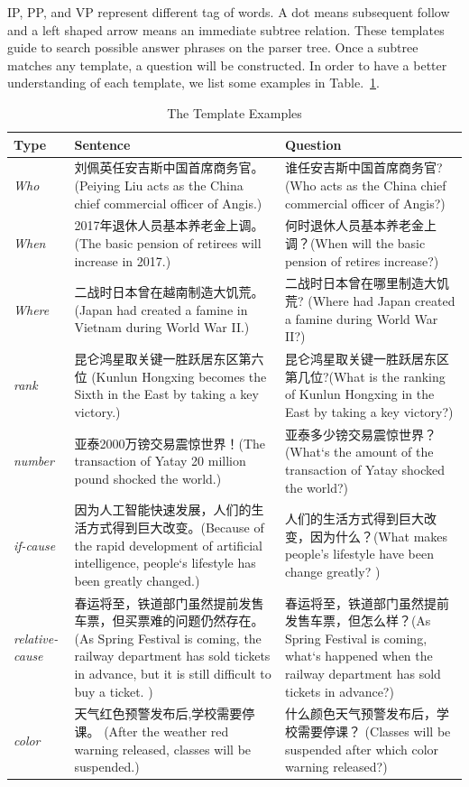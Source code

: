 \documentclass[runningheads,UTF8,article]{comsis2}
\newcommand\revised[1]{{\color{black} #1}}
\begin{document}
	IP, PP, and VP represent different tag of words. A dot means subsequent follow and a left shaped arrow means an immediate subtree relation. These templates guide to search possible answer phrases on the parser tree. Once a subtree matches any template, a question will be constructed.
	\revised{
	In order to have a better understanding of each template, we list some examples in Table.~\ref{example}.}
	
	
	\begin{table}[!ht]
		\centering
		\caption{The Template Examples}
		\setlength\tabcolsep{0.5em}
		\label{example}
		\begin{tabular}{|p{25pt}|p{155pt} | p{150pt} |}
			\hline
			Type& Sentence & Question \\
			\hline
			\emph{Who} & 刘佩英任安吉斯中国首席商务官。(Peiying Liu acts as the China chief commercial officer of Angis.) & 谁任安吉斯中国首席商务官?(Who acts as the China chief commercial officer of Angis?)\\
			\hline
			\emph{When} & 2017年退休人员基本养老金上调。(The basic pension of retirees will increase in 2017.) & 何时退休人员基本养老金上调？(When will the basic pension of retires increase?)  \\
			\hline
			\emph{Where} & 二战时日本曾在越南制造大饥荒。(Japan had created a famine in Vietnam during World War II.)& 二战时日本曾在哪里制造大饥荒?	(Where had Japan created a famine during World War II?) \\
			\hline
			\emph{rank}& 昆仑鸿星取关键一胜跃居东区第六位 (Kunlun Hongxing becomes the Sixth in the East by taking a key victory.)& 昆仑鸿星取关键一胜跃居东区第几位?(What is the ranking of Kunlun Hongxing in the East by taking a key victory?)\\
			\hline
			\emph{number}& 亚泰2000万镑交易震惊世界！(The transaction of Yatay 20 million pound shocked the world.)& 亚泰多少镑交易震惊世界？(What`s the amount of the transaction of Yatay shocked the world?) \\
			\hline
			\emph{if-cause}& 因为人工智能快速发展，人们的生活方式得到巨大改变。(Because of the rapid development of artificial intelligence, people`s lifestyle has been greatly changed.)&	人们的生活方式得到巨大改变，因为什么？(What makes people's lifestyle have been change greatly? )\\
			\hline
			\emph{relative-cause}& 春运将至，铁道部门虽然提前发售车票，但买票难的问题仍然存在。	(As Spring Festival is coming, the railway department has sold tickets in advance, but it is still difficult to buy a ticket. )&春运将至，铁道部门虽然提前发售车票，但怎么样？(As Spring Festival is coming, what`s happened when the railway department has sold tickets in advance?)\\
			
			\hline
			\emph{color} & 天气红色预警发布后,学校需要停课。 (After the weather red warning released, classes will be suspended.) &   什么颜色天气预警发布后，学校需要停课？ (Classes will be suspended after which color warning released?) \\ 
			\hline
		\end{tabular}
	\end{table}	
	
\end{document}
